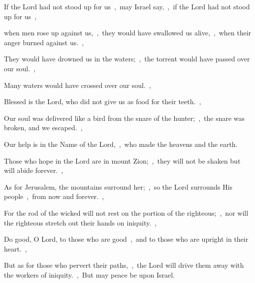 \documentclass[12pt,twoside,a5paper]{article}
\begin{document}
\begin{normalparskip}
  If the Lord had not stood up for us~\sep\ may Israel say,~\sep\ if the Lord had not stood up for us~\sep


  when men rose up against us,~\sep\ they would have swallowed us alive,~\sep\ when their anger burned against us.~\sep

  They would have drowned us in the waters;~\sep\ the torrent would have passed over our soul.~\sep

  Many waters would have crossed over our soul.~\sep

  Blessed is the Lord, who did not give us as food for their teeth.~\sep

  Our soul was delivered like a bird from the snare of the hunter;~\sep\ the snare was broken, and we escaped.~\sep

  Our help is in the Name of the Lord,~\sep\ who made the heavens and the earth.
\end{normalparskip}


\begin{normalparskip}
  Those who hope in the Lord are in mount Zion;~\sep\ they will not be shaken but will abide forever.~\sep


  As for Jerusalem, the mountains surround her;~\sep\ so the Lord surrounds His people~\sep\ from now and forever.~\sep

  For the rod of the wicked will not rest on the portion of the righteous;~\sep\ nor will the righteous stretch out their hands on iniquity.~\sep

  Do good, O Lord, to those who are good~\sep\ and to those who are upright in their heart.~\sep

  But as for those who pervert their paths,~\sep\ the Lord will drive them away with the workers of iniquity.~\sep\ But may peace be upon Israel.
\end{normalparskip}


\end{document}
